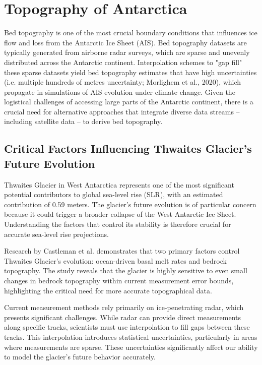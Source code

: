 \chapter*{Topography of Antarctica}\label{review}

Bed topography is one of the most crucial boundary conditions that influences ice flow and loss from the Antarctic Ice Sheet (AIS)\cite{Morlighem_2020}. Bed topography datasets are typically generated from airborne radar surveys, which are sparse and unevenly distributed across the Antarctic continent. Interpolation schemes to "gap fill" these sparse datasets yield bed topography estimates that have high uncertainties (i.e. multiple hundreds of metres uncertainty; Morlighem et al., 2020), which propagate in simulations of AIS evolution under climate change\cite{Castleman_2022}. Given the logistical challenges of accessing large parts of the Antarctic continent, there is a crucial need for alternative approaches that integrate diverse data streams – including satellite data – to derive bed topography.

\section*{Critical Factors Influencing Thwaites Glacier's Future Evolution} %

Thwaites Glacier in West Antarctica represents one of the most significant potential contributors to global sea-level rise (SLR), with an estimated contribution of 0.59 meters. The glacier's future evolution is of particular concern because it could trigger a broader collapse of the West Antarctic Ice Sheet. Understanding the factors that control its stability is therefore crucial for accurate sea-level rise projections.

Research by Castleman et al.\cite{Castleman_2022} demonstrates that two primary factors control Thwaites Glacier's evolution: ocean-driven basal melt rates and bedrock topography. The study reveals that the glacier is highly sensitive to even small changes in bedrock topography within current measurement error bounds, highlighting the critical need for more accurate topographical data.

Current measurement methods rely primarily on ice-penetrating radar, which presents significant challenges. While radar can provide direct measurements along specific tracks, scientists must use interpolation to fill gaps between these tracks. This interpolation introduces statistical uncertainties, particularly in areas where measurements are sparse. These uncertainties significantly affect our ability to model the glacier's future behavior accurately.

